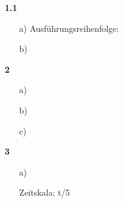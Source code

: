 \documentclass[a4paper,11pt]{article}
\author{\authorinfo}
\title{\titleinfo}
\date{\today}
\begin{document}
\maketitle


\begin{enumerate}
\item[\textbf{1.1}]

\begin{itemize}
    \item[a)] Ausführungsreihenfolge:
    \begin{figure}[h]
        \scalebox{0.5}{}
    \end{figure}
    \item[b)]
\end{itemize}

\item[\textbf{2}]

\begin{itemize}
    \item[a)]

    \item[b)]

    \item[c)] 
\end{itemize}

\item[\textbf{3}]

\begin{itemize}
    \item[a)]

    Zeitskala: t/5

    \begin{blockgraph}{34}{5}{0.4} %







\end{blockgraph}
\end{itemize}
\end{enumerate}
\end{document}
